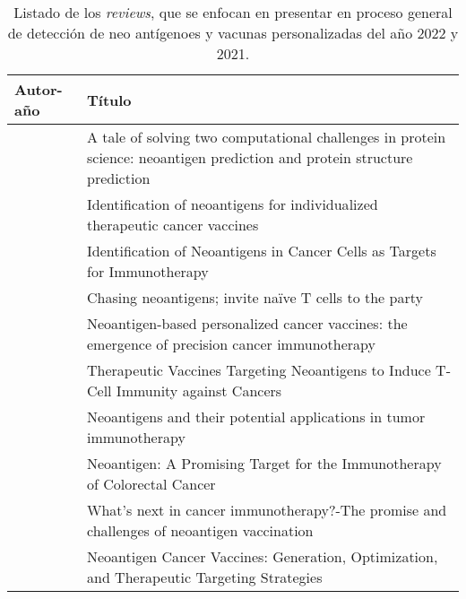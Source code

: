 \begin{table}[H]
	\caption{Listado de los \textit{reviews}, que se enfocan en presentar en proceso general de detección de neo antígenoes y vacunas personalizadas del año 2022 y 2021.}
	\label{tab:review_2022_2021}
	\begin{tabular}{p{3cm}p{10cm}}
		\textbf{Autor-año }                            & \textbf{Título}                                                                                                                             \\ \hline
		\cite{tran2022tale}                   & A tale of solving two computational challenges in protein science: neoantigen prediction and protein structure prediction                 \\
		\cite{lang2022identification}         & Identification of neoantigens for individualized therapeutic cancer vaccines                                                              \\
		\cite{okada2022identification}        & Identification of Neoantigens in Cancer Cells as Targets for Immunotherapy                                                                \\
		\cite{bollineni2022chasing}           & Chasing neoantigens; invite naïve T cells to the party                                                                                    \\
		\cite{richard2022neoantigen}          & Neoantigen-based personalized cancer vaccines: the emergence of precision cancer immunotherapy                                            \\
		\cite{pao2022therapeutic}             & Therapeutic Vaccines Targeting Neoantigens to Induce T-Cell Immunity against Cancers                                                      \\
		\cite{fang2022neoantigens}            & Neoantigens and their potential applications in tumor immunotherapy                                                                       \\
		\cite{zheng2022neoantigen}            & Neoantigen: A Promising Target for the Immunotherapy of Colorectal Cancer                                                                 \\
		\cite{redwood2022s}                   & What's next in cancer immunotherapy?-The promise and challenges of neoantigen vaccination                                                 \\
		\cite{reynolds2022neoantigen}         & Neoantigen Cancer Vaccines: Generation, Optimization, and Therapeutic Targeting Strategies                                                \\

\end{tabular}
\end{table}
